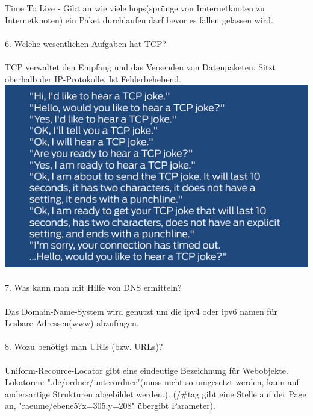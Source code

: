 \documentclass{article}
\begin{document}
\\
\\
Time To Live - Gibt an wie viele hops(spr\"unge von Imternetknoten zu Internetknoten) ein Paket durchlaufen darf bevor es fallen gelassen wird.
\\
\\
6. Welche wesentlichen Aufgaben hat TCP?
\\
\\
TCP verwaltet den Empfang und das Versenden von Datenpaketen. Sitzt oberhalb der IP-Protokolle. Ist Fehlerbehebend.\\
\includegraphics[width = \textwidth]{TCP.png}
\\
\\
7. Was kann man mit Hilfe von DNS ermitteln?
\\
\\
Das Domain-Name-System wird genutzt um die  ipv4 oder ipv6 namen f\"ur Lesbare Adressen(www) abzufragen. 
\\
\\
8. Wozu benötigt man URIs (bzw. URLs)?
\\
\\
Uniform-Recource-Locator gibt eine eindeutige Bezeichnung f\"ur Webobjekte.\\
Lokatoren: ".de/ordner/unterordner"(muss nicht so umgesetzt werden, kann auf andersartige Strukturen abgebildet werden.). (/#tag gibt eine Stelle auf der Page an, "raeume/ebene5?x=305,y=208" \"ubergibt Parameter).
\end{document}

